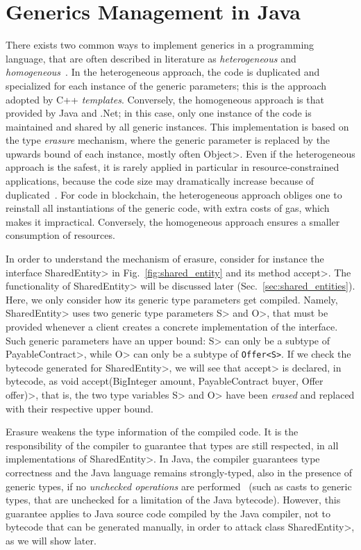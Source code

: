 \section{Generics Management in Java}\label{sec:java_generics}

There exists two common ways to implement generics in a programming language,
that are often described in literature as \emph{heterogeneous}
and \emph{homogeneous}~\cite{generics_categories}.
In the heterogeneous approach, the code is duplicated and specialized for each instance
of the generic parameters; this is the approach adopted by C++ \emph{templates}.
Conversely, the homogeneous approach is that provided by Java and .Net; in this case,
only one instance of the code is maintained and shared by all generic instances.
This implementation is based on the type \emph{erasure} mechanism, where the generic parameter
is replaced by the upwards bound of each instance, mostly often \<Object>.
Even if the heterogeneous approach is the safest, it is rarely applied in particular
in resource-constrained applications, because the code size may dramatically increase
because of duplicated~\cite{generics_embedded_systems}. For code in blockchain,
the heterogeneous approach obliges one to reinstall all instantiations of the generic code,
with extra costs of gas, which makes it impractical.
Conversely, the homogeneous approach ensures a smaller consumption of resources.

In order to understand the mechanism of erasure, consider for instance
the interface \<SharedEntity> in Fig.~\ref{fig:shared_entity} and its method \<accept>.
The functionality of \<SharedEntity> will be discussed later (Sec.~\ref{sec:shared_entities}).
Here, we only consider how its generic type parameters get compiled.
Namely, \<SharedEntity> uses two generic type parameters \<S> and \<O>, that must be provided
whenever a client creates a concrete implementation of the interface.
Such generic parameters have an upper bound: \<S> can only be a subtype of \<PayableContract>,
while \<O> can only be a subtype of {\codesize\texttt{Offer<S>}}. If we check the bytecode
generated for \<SharedEntity>, we will see that \<accept> is declared, in bytecode, as
\<void accept(BigInteger amount, PayableContract buyer, Offer offer)>, that is,
the two type variables \<S> and \<O> have been \emph{erased} and replaced with their
respective upper bound.

Erasure weakens the type information of the compiled code. It is the responsibility of the
compiler to guarantee that types are still respected, in all implementations of \<SharedEntity>.
In Java, the compiler guarantees type correctness and the Java language remains strongly-typed,
also in the presence of generic types,
if no \emph{unchecked operations} are performed~\cite{NaftalinW06} (such as casts to generic types,
that are unchecked for a limitation of the Java bytecode).
However, this guarantee applies to Java source code compiled by the Java compiler,
not to bytecode that can be generated manually, in order to attack class \<SharedEntity>,
as we will show later.
